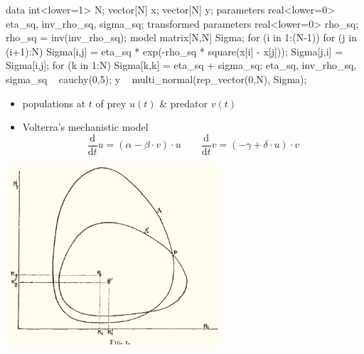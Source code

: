 \documentclass[10pt]{report}
\begin{document}
%
\vspace*{-5pt}
\begin{stancode}
data {
  int<lower=1> N;  vector[N] x; vector[N] y;
} parameters {
  real<lower=0> eta_sq, inv_rho_sq, sigma_sq;
} transformed parameters {
  real<lower=0> rho_sq; rho_sq = inv(inv_rho_sq);
} model {
  matrix[N,N] Sigma;
  for (i in 1:(N-1)) {
    for (j in (i+1):N) {
      Sigma[i,j] = eta_sq * exp(-rho_sq * square(x[i] - x[j]));
      Sigma[j,i] = Sigma[i,j];
  }}
  for (k in 1:N) Sigma[k,k] = eta_sq + sigma_sq;
  eta_sq, inv_rho_sq, sigma_sq ~ cauchy(0,5);
  y ~ multi_normal(rep_vector(0,N), Sigma);
}
\end{stancode}


\begin{itemize}
\item populations at $t$ of prey $u(t)$ \& predator $v(t)$
\item Volterra's mechanistic model
$$
\frac{\textrm{d}}{\textrm{d}t}u = (\alpha - \beta \cdot v) \cdot u
\qquad
\frac{\textrm{d}}{\textrm{d}t}v = (-\gamma + \delta \cdot u) \cdot v
$$
\vspace*{-12pt}
\end{itemize}

\begin{center}
\includegraphics[width=0.6\textwidth]{img/volterra-solutions.jpg}
\end{center}
\end{document}
